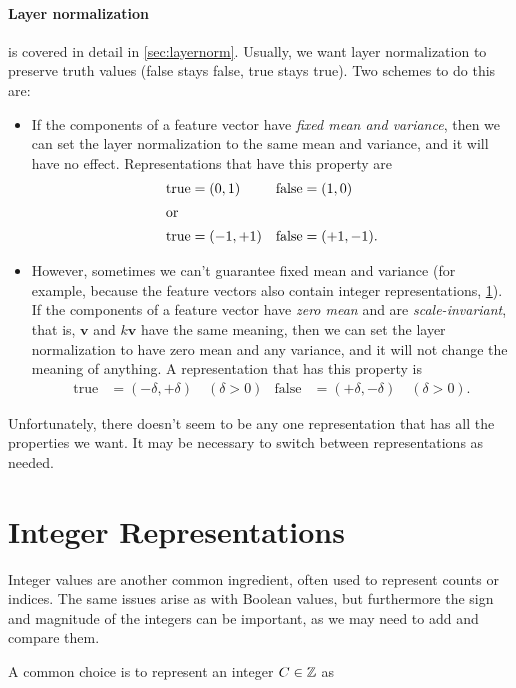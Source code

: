 \paragraph{Layer normalization} is covered in detail in \cref{sec:layernorm}. Usually, we want layer normalization to preserve truth values (false stays false, true stays true). Two schemes to do this are:
\begin{itemize}
\item If the components of a feature vector have \emph{fixed mean and variance}, then we can set the layer normalization to the same mean and variance, and it will have no effect. Representations that have this property are
  \begin{align*}
    \text{true} &= (0, 1) & \text{false} &= (1, 0) \\
    \intertext{or}
    \text{true} &= (-1, +1) & \text{false} &= (+1, -1).
  \end{align*}
\item However, sometimes we can't guarantee fixed mean and variance (for example, because the feature vectors also contain integer representations, \cref{sec:integers}). If the components of a feature vector have \emph{zero mean} and are \emph{scale-invariant}, that is, $\mathbf{v}$ and $k\mathbf{v}$ have the same meaning, then we can set the layer normalization to have zero mean and any variance, and it will not change the meaning of anything. A representation that has this property is
  \begin{align*}
    \text{true} &= (-\delta, +\delta) \quad (\delta>0) & \text{false} &= (+\delta, -\delta) \quad (\delta>0).
  \end{align*}
\end{itemize}

Unfortunately, there doesn't seem to be any one representation that has all the properties we want. It may be necessary to switch between representations as needed.

\section{Integer Representations}
\label{sec:integers}


Integer values are another common ingredient, often used to represent counts or indices. The same issues arise as with Boolean values, but furthermore the sign and magnitude of the integers can be important, as we may need to add and compare them.

A common choice is to represent an integer $C\in \mathbb{Z}$ as

